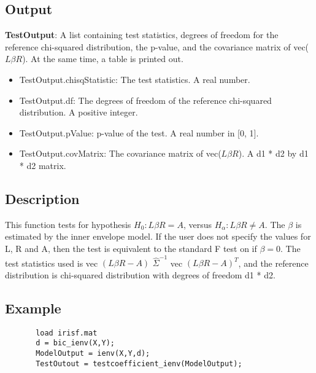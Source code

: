 \documentclass[a4paper,11pt,openany]{memoir}
\begin{document}
\subsection*{Output}

\begin{par}
\textbf{TestOutput}: A list containing test statistics, degrees of freedom for the reference chi-squared distribution, the p-value, and the covariance matrix of vec($L\beta R$).  At the same time, a table is printed out.
\end{par} \vspace{1em}
\begin{itemize}
\setlength{\itemsep}{-1ex}
   \item TestOutput.chisqStatistic: The test statistics. A real number.
   \item TestOutput.df: The degrees of freedom of the reference chi-squared distribution.  A positive integer.
   \item TestOutput.pValue: p-value of the test.  A real number in [0, 1].
   \item TestOutput.covMatrix: The covariance matrix of vec($L\beta R$). A d1 * d2 by d1 * d2 matrix.
\end{itemize}

\subsection*{Description}

\begin{par}
This function tests for hypothesis $H_0: L\beta R = A$, versus $H_\alpha: L\beta R\neq A$.  The $\beta$ is estimated by the inner envelope model.  If the user does not specify the values for L, R and A, then the test is equivalent to the standard F test on if $\beta = 0$.  The test statistics used is vec $(L\beta R - A)$ $\hat{\Sigma}^{-1}$ vec $(L\beta R - A)^{T}$, and the reference distribution is chi-squared distribution with degrees of freedom d1 * d2.
\end{par} \vspace{1em}


\subsection*{Example}


\begin{verbatim}       load irisf.mat
       d = bic_ienv(X,Y);
       ModelOutput = ienv(X,Y,d);
       TestOutout = testcoefficient_ienv(ModelOutput);\end{verbatim}
       
\end{document}
